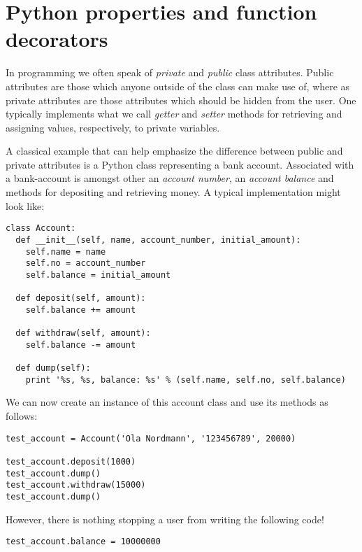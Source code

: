 \documentclass{article}
\begin{document}
  \section{Python properties and function decorators}
  \label{sec:python_properties_and_function_decorators}
  
  In programming we often speak of \emph{private} and \emph{public} class
  attributes. Public attributes are those which anyone outside of the class can
  make use of, where as private attributes are those attributes which should be
  hidden from the user. One typically implements what we call \emph{getter} and
  \emph{setter} methods for retrieving and assigning values, respectively, to
  private variables.

  A classical example that can help emphasize the difference between public and
  private attributes is a Python class representing a bank account. Associated
  with a bank-account is amongst other an \emph{account number}, an
  \emph{account balance} and methods for depositing and retrieving money. A
  typical implementation might look like:
  \begin{verbatim}
class Account:
  def __init__(self, name, account_number, initial_amount):
    self.name = name
    self.no = account_number
    self.balance = initial_amount
  
  def deposit(self, amount):
    self.balance += amount

  def withdraw(self, amount):
    self.balance -= amount

  def dump(self):
    print '%s, %s, balance: %s' % (self.name, self.no, self.balance)
  \end{verbatim}
  We can now create an instance of this account class and use its methods as follows:
  \begin{verbatim}
test_account = Account('Ola Nordmann', '123456789', 20000) 

test_account.deposit(1000)
test_account.dump()
test_account.withdraw(15000)
test_account.dump()
  \end{verbatim}
  However, there is nothing stopping a user from writing the following code!
  \begin{verbatim}
test_account.balance = 10000000 
  \end{verbatim}
\end{document}
